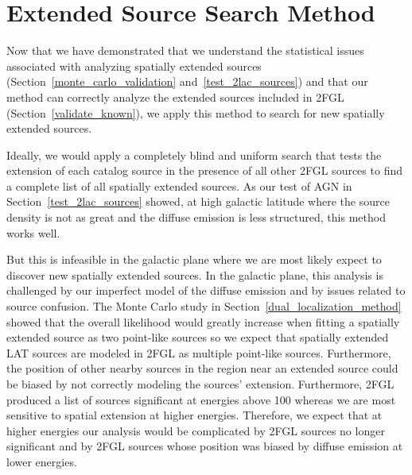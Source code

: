 \documentclass[12pt,preprint]{aastex}
\newcommand{\mev}{\text{MeV}\xspace}
\newcommand{\gev}{\text{GeV}\xspace}
\begin{document}
\section{Extended Source Search Method}
\label{extended_source_search_method}


Now that we have demonstrated that we understand the statistical
issues associated with analyzing spatially extended sources
(Section~\ref{monte_carlo_validation} and~\ref{test_2lac_sources}) and
that our method can correctly analyze the extended sources included in
2FGL (Section~\ref{validate_known}), we apply this method to search for
new spatially extended \gev sources.

Ideally, we would apply a completely blind and uniform search that
tests the extension of each catalog source in the presence of all other
2FGL sources to find a complete list of all spatially extended sources.
As our test of AGN in Section~\ref{test_2lac_sources} showed, at high
galactic latitude where the source density is not as great and the
diffuse emission is less structured, this method works well.

But this is infeasible in the galactic plane where we are most likely expect
to discover new spatially extended sources.  In the galactic plane,
this analysis is challenged by our imperfect model of the diffuse
emission and by issues related to source confusion.  The Monte Carlo
study in Section~\ref{dual_localization_method}
showed that the overall likelihood would greatly increase when fitting
a spatially extended source as two point-like sources so we expect
that spatially extended LAT sources are modeled in 2FGL as
multiple point-like sources. Furthermore, the position of other nearby sources
in the region near an extended source could be biased by not correctly
modeling the
sources' extension.  Furthermore, 2FGL produced a
list of sources significant at energies above 100 \mev whereas we are
most sensitive to spatial extension at higher energies.  Therefore,
we expect that at higher energies our analysis would be complicated
by 2FGL sources no longer significant and by 2FGL
sources whose position was biased by diffuse emission at lower energies.
\end{document}
